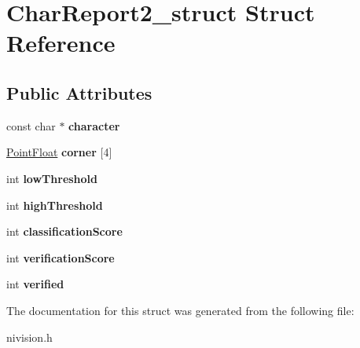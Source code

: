 \hypertarget{structCharReport2__struct}{
\section{CharReport2\_\-struct Struct Reference}
\label{structCharReport2__struct}
}
\subsection*{Public Attributes}
\begin{DoxyCompactItemize}
\item 
\hypertarget{structCharReport2__struct_ad92251a1d59b63d1e4532e920d0b8b07}{
const char $\ast$ {\bfseries character}}
\label{structCharReport2__struct_ad92251a1d59b63d1e4532e920d0b8b07}

\item 
\hypertarget{structCharReport2__struct_a2d6cc0eb57ac2b14a5b6105908696654}{
\hyperlink{structPointFloat__struct}{PointFloat} {\bfseries corner} \mbox{[}4\mbox{]}}
\label{structCharReport2__struct_a2d6cc0eb57ac2b14a5b6105908696654}

\item 
\hypertarget{structCharReport2__struct_a658641bd1fdfec45b009598cc9c6507a}{
int {\bfseries lowThreshold}}
\label{structCharReport2__struct_a658641bd1fdfec45b009598cc9c6507a}

\item 
\hypertarget{structCharReport2__struct_afa6d0d23cc46c833df0698991dc733de}{
int {\bfseries highThreshold}}
\label{structCharReport2__struct_afa6d0d23cc46c833df0698991dc733de}

\item 
\hypertarget{structCharReport2__struct_a25182094445b1be411aad8260247cc34}{
int {\bfseries classificationScore}}
\label{structCharReport2__struct_a25182094445b1be411aad8260247cc34}

\item 
\hypertarget{structCharReport2__struct_a05a1b0daf3084aec7c92c7278c7496c6}{
int {\bfseries verificationScore}}
\label{structCharReport2__struct_a05a1b0daf3084aec7c92c7278c7496c6}

\item 
\hypertarget{structCharReport2__struct_a79b918cfe8c50c0cf05783a1216f1f83}{
int {\bfseries verified}}
\label{structCharReport2__struct_a79b918cfe8c50c0cf05783a1216f1f83}

\end{DoxyCompactItemize}


The documentation for this struct was generated from the following file:\begin{DoxyCompactItemize}
\item 
nivision.h\end{DoxyCompactItemize}
